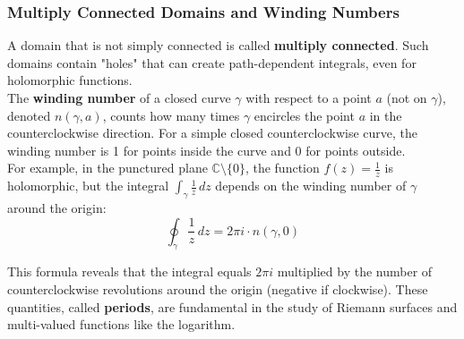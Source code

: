 \subsubsection*{Multiply Connected Domains and Winding Numbers}  

\noindent A domain that is not simply connected is called \textbf{multiply connected}. Such domains contain "holes" that can create path-dependent integrals, even for holomorphic functions. \\

\noindent The \textbf{winding number} of a closed curve $\gamma$ with respect to a point $a$ (not on $\gamma$), denoted $n(\gamma,a)$, counts how many times $\gamma$ encircles the point $a$ in the counterclockwise direction. For a simple closed counterclockwise curve, the winding number is 1 for points inside the curve and 0 for points outside. \\

\noindent For example, in the punctured plane $\mathbb{C} \setminus \{0\}$, the function $f(z) = \frac{1}{z}$ is holomorphic, but the integral $\int_{\gamma} \frac{1}{z} \, dz$ depends on the winding number of $\gamma$ around the origin:
\[
\oint_{\gamma} \frac{1}{z} \, dz = 2\pi i \cdot n(\gamma,0)
\]

\noindent This formula reveals that the integral equals $2\pi i$ multiplied by the number of counterclockwise revolutions around the origin (negative if clockwise). These quantities, called \textbf{periods}, are fundamental in the study of Riemann surfaces and multi-valued functions like the logarithm.

